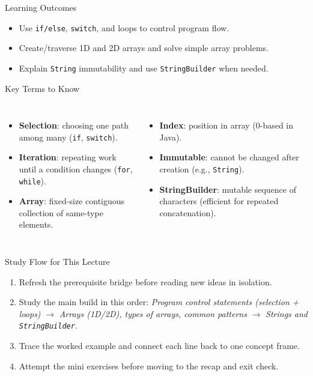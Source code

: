 \documentclass{beamer}
\begin{document}
\begin{frame}{Learning Outcomes}
  \begin{itemize}[<+->]
    \item Use \texttt{if/else}, \texttt{switch}, and loops to control program flow.
    \item Create/traverse 1D and 2D arrays and solve simple array problems.
    \item Explain \texttt{String} immutability and use \texttt{StringBuilder} when needed.
  \end{itemize}
  \slidesources{\OOPSUnitISources}
\end{frame}

\begin{frame}{Key Terms to Know}
\small
\begin{columns}[t]
\begin{itemize}
  \item \textbf{Selection}: choosing one path among many (\texttt{if}, \texttt{switch}).
  \item \textbf{Iteration}: repeating work until a condition changes (\texttt{for}, \texttt{while}).
  \item \textbf{Array}: fixed-size contiguous collection of same-type elements.
\end{itemize}
\begin{itemize}
  \item \textbf{Index}: position in array (0-based in Java).
  \item \textbf{Immutable}: cannot be changed after creation (e.g., \texttt{String}).
  \item \textbf{StringBuilder}: mutable sequence of characters (efficient for repeated concatenation).
\end{itemize}
\end{columns}
  \slidesources{\OOPSUnitISources}
\end{frame}

\begin{frame}{Study Flow for This Lecture}
\begin{enumerate}[<+->]
  \item Refresh the prerequisite bridge before reading new ideas in isolation.
  \item Study the main build in this order: \textit{Program control statements (selection + loops)} $\rightarrow$ \textit{Arrays (1D/2D), types of arrays, common patterns} $\rightarrow$ \textit{Strings and \texttt{StringBuilder}}.
  \item Trace the worked example and connect each line back to one concept frame.
  \item Attempt the mini exercises before moving to the recap and exit check.
\end{enumerate}
  \slidesources{\OOPSUnitISources}
\end{frame}
\end{document}
